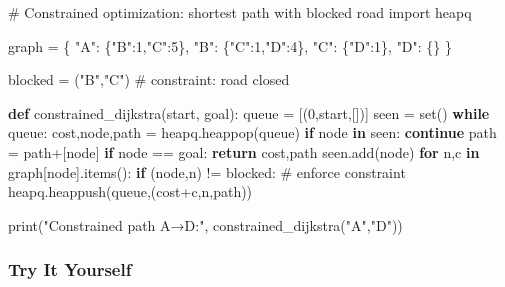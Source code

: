 \documentclass[
  letterpaper,
  DIV=11,
  numbers=noendperiod]{scrreprt}
\newenvironment{Shaded}{\begin{snugshade}}{\end{snugshade}}
\newcommand{\BuiltInTok}[1]{\textcolor[rgb]{0.00,0.23,0.31}{#1}}
\newcommand{\CommentTok}[1]{\textcolor[rgb]{0.37,0.37,0.37}{#1}}
\newcommand{\ControlFlowTok}[1]{\textcolor[rgb]{0.00,0.23,0.31}{\textbf{#1}}}
\newcommand{\DecValTok}[1]{\textcolor[rgb]{0.68,0.00,0.00}{#1}}
\newcommand{\ImportTok}[1]{\textcolor[rgb]{0.00,0.46,0.62}{#1}}
\newcommand{\KeywordTok}[1]{\textcolor[rgb]{0.00,0.23,0.31}{\textbf{#1}}}
\newcommand{\NormalTok}[1]{\textcolor[rgb]{0.00,0.23,0.31}{#1}}
\newcommand{\OperatorTok}[1]{\textcolor[rgb]{0.37,0.37,0.37}{#1}}
\newcommand{\StringTok}[1]{\textcolor[rgb]{0.13,0.47,0.30}{#1}}
\begin{document}
\begin{Shaded}
\begin{Highlighting}[]
\CommentTok{\# Constrained optimization: shortest path with blocked road}
\ImportTok{import}\NormalTok{ heapq}

\NormalTok{graph }\OperatorTok{=}\NormalTok{ \{}
    \StringTok{"A"}\NormalTok{: \{}\StringTok{"B"}\NormalTok{:}\DecValTok{1}\NormalTok{,}\StringTok{"C"}\NormalTok{:}\DecValTok{5}\NormalTok{\},}
    \StringTok{"B"}\NormalTok{: \{}\StringTok{"C"}\NormalTok{:}\DecValTok{1}\NormalTok{,}\StringTok{"D"}\NormalTok{:}\DecValTok{4}\NormalTok{\},}
    \StringTok{"C"}\NormalTok{: \{}\StringTok{"D"}\NormalTok{:}\DecValTok{1}\NormalTok{\},}
    \StringTok{"D"}\NormalTok{: \{\}}
\NormalTok{\}}

\NormalTok{blocked }\OperatorTok{=}\NormalTok{ (}\StringTok{"B"}\NormalTok{,}\StringTok{"C"}\NormalTok{)  }\CommentTok{\# constraint: road closed}

\KeywordTok{def}\NormalTok{ constrained\_dijkstra(start, goal):}
\NormalTok{    queue }\OperatorTok{=}\NormalTok{ [(}\DecValTok{0}\NormalTok{,start,[])]}
\NormalTok{    seen }\OperatorTok{=} \BuiltInTok{set}\NormalTok{()}
    \ControlFlowTok{while}\NormalTok{ queue:}
\NormalTok{        cost,node,path }\OperatorTok{=}\NormalTok{ heapq.heappop(queue)}
        \ControlFlowTok{if}\NormalTok{ node }\KeywordTok{in}\NormalTok{ seen:}
            \ControlFlowTok{continue}
\NormalTok{        path }\OperatorTok{=}\NormalTok{ path}\OperatorTok{+}\NormalTok{[node]}
        \ControlFlowTok{if}\NormalTok{ node }\OperatorTok{==}\NormalTok{ goal:}
            \ControlFlowTok{return}\NormalTok{ cost,path}
\NormalTok{        seen.add(node)}
        \ControlFlowTok{for}\NormalTok{ n,c }\KeywordTok{in}\NormalTok{ graph[node].items():}
            \ControlFlowTok{if}\NormalTok{ (node,n) }\OperatorTok{!=}\NormalTok{ blocked:  }\CommentTok{\# enforce constraint}
\NormalTok{                heapq.heappush(queue,(cost}\OperatorTok{+}\NormalTok{c,n,path))}

\BuiltInTok{print}\NormalTok{(}\StringTok{"Constrained path A→D:"}\NormalTok{, constrained\_dijkstra(}\StringTok{"A"}\NormalTok{,}\StringTok{"D"}\NormalTok{))}
\end{Highlighting}
\end{Shaded}

\subsubsection{Try It Yourself}\label{try-it-yourself-69}
\end{document}
